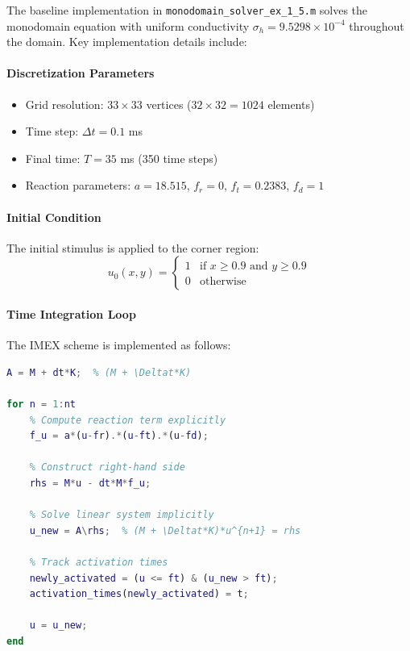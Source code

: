 The baseline implementation in \texttt{monodomain\_solver\_ex\_1\_5.m} solves the monodomain equation with uniform conductivity $\sigma_h = 9.5298 \times 10^{-4}$ throughout the domain. Key implementation details include:

\paragraph{Discretization Parameters}
\begin{itemize}
    \item Grid resolution: $33 \times 33$ vertices ($32 \times 32 = 1024$ elements)
    \item Time step: $\Delta t = 0.1$ ms
    \item Final time: $T = 35$ ms (350 time steps)
    \item Reaction parameters: $a = 18.515$, $f_r = 0$, $f_t = 0.2383$, $f_d = 1$
\end{itemize}

\paragraph{Initial Condition}
The initial stimulus is applied to the corner region:
\begin{equation}
u_0(x,y) = \begin{cases}
1 & \text{if } x \geq 0.9 \text{ and } y \geq 0.9 \\
0 & \text{otherwise}
\end{cases}
\end{equation}

\paragraph{Time Integration Loop}
The IMEX scheme is implemented as follows:

\begin{lstlisting}[language=Matlab, caption=IMEX time integration in MATLAB]
% Assemble system matrix once
A = M + dt*K;  % (M + \Deltat*K)

for n = 1:nt
    % Compute reaction term explicitly
    f_u = a*(u-fr).*(u-ft).*(u-fd);
    
    % Construct right-hand side
    rhs = M*u - dt*M*f_u;
    
    % Solve linear system implicitly
    u_new = A\rhs;  % (M + \Deltat*K)*u^{n+1} = rhs
    
    % Track activation times
    newly_activated = (u <= ft) & (u_new > ft);
    activation_times(newly_activated) = t;
    
    u = u_new;
end
\end{lstlisting}

